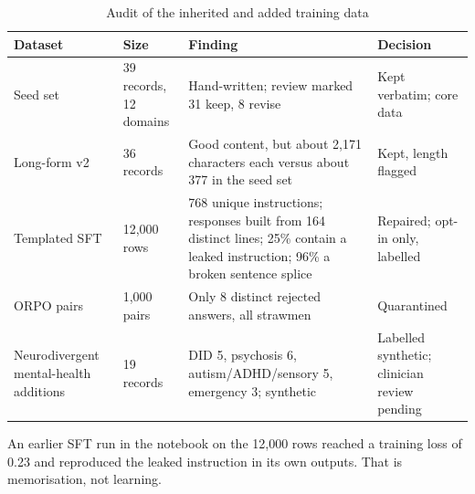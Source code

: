 \documentclass[11pt,a4paper]{article}
\begin{document}
\begin{table}[H]
\centering
\caption{Audit of the inherited and added training data}
\label{tab:audit}
\small
\begin{tabularx}{\textwidth}{@{}L{2.9cm}L{2.2cm}YL{3.3cm}@{}}
\toprule
\textbf{Dataset} & \textbf{Size} & \textbf{Finding} & \textbf{Decision}\\
\midrule
Seed set & 39 records, 12 domains & Hand-written; review marked 31 keep, 8 revise & Kept verbatim; core data\\
Long-form v2 & 36 records & Good content, but about 2,171 characters each versus about 377 in the seed set & Kept, length flagged\\
Templated SFT & 12,000 rows & 768 unique instructions; responses built from 164 distinct lines; 25\% contain a leaked instruction; 96\% a broken sentence splice & Repaired; opt-in only, labelled\\
ORPO pairs & 1,000 pairs & Only 8 distinct rejected answers, all strawmen & Quarantined\\
Neurodivergent mental-health additions & 19 records & DID 5, psychosis 6, autism/ADHD/sensory 5, emergency 3; synthetic & Labelled synthetic; clinician review pending\\
\bottomrule
\end{tabularx}
\end{table}

An earlier SFT run in the notebook on the 12,000 rows reached a training loss of 0.23 and reproduced the leaked
instruction in its own outputs. That is memorisation, not learning.
\end{document}
